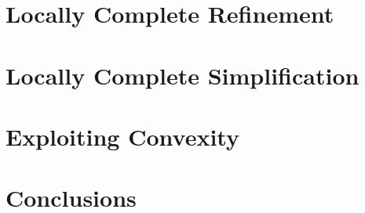 \section{Locally Complete Refinement}

\section{Locally Complete Simplification}

\section{Exploiting Convexity}

\section{Conclusions}
